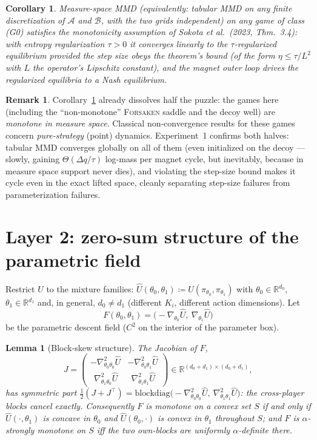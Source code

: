\documentclass[11pt]{article}
\newtheorem{lemma}{Lemma}
\newtheorem{corollary}{Corollary}
\theoremstyle{definition}
\newtheorem{remark}{Remark}
\newcommand{\R}{\mathbb{R}}
\newcommand{\cA}{\mathcal{A}}
\newcommand{\cB}{\mathcal{B}}
\begin{document}
\begin{corollary}\label{cor:measure-mmd}
Measure-space MMD (equivalently: tabular MMD on any finite discretization of
$\cA$ and $\cB$, with the two grids independent) on any game of class (G0)
satisfies the monotonicity assumption of Sokota et al.\ (2023, Thm.~3.4): with
entropy regularization $\tau > 0$ it converges linearly to the
$\tau$-regularized equilibrium provided the step size obeys the theorem's bound
(of the form $\eta \le \tau / L^2$ with $L$ the operator's Lipschitz constant),
and the magnet outer loop drives the regularized equilibria to a Nash
equilibrium.
\end{corollary}

\begin{remark}
Corollary~\ref{cor:measure-mmd} already dissolves half the puzzle: the games
here (including the ``non-monotone'' \textsc{Forsaken} saddle and the decoy
well) are \emph{monotone in measure space}. Classical non-convergence results
for these games concern \emph{pure-strategy} (point) dynamics. Experiment~1
confirms both halves: tabular MMD converges globally on all of them (even
initialized on the decoy --- slowly, gaining $\Theta(\Delta q / \tau)$ log-mass
per magnet cycle, but inevitably, because in measure space support never
dies), and violating the step-size bound makes it cycle even in the exact
lifted space, cleanly separating step-size failures from parameterization
failures.
\end{remark}

\section{Layer 2: zero-sum structure of the parametric field}

Restrict $U$ to the mixture families:
$\widehat{U}(\theta_0, \theta_1) \coloneqq U(\pi_{\theta_0}, \pi_{\theta_1})$
with $\theta_0 \in \R^{d_0}$, $\theta_1 \in \R^{d_1}$ and, in general,
$d_0 \ne d_1$ (different $K_i$, different action dimensions). Let
\[
  F(\theta_0,\theta_1) =
  \big({-}\nabla_{\theta_0}\widehat U,\ \nabla_{\theta_1}\widehat U\big)
\]
be the parametric descent field ($C^2$ on the interior of the parameter box).

\begin{lemma}[Block-skew structure]\label{lem:skewblock}
The Jacobian of $F$,
\[
  J = \begin{pmatrix}
    -\nabla^2_{\theta_0\theta_0} \widehat U & -\nabla^2_{\theta_0\theta_1} \widehat U\\[2pt]
    \ \ \nabla^2_{\theta_1\theta_0} \widehat U & \ \ \nabla^2_{\theta_1\theta_1} \widehat U
  \end{pmatrix}
  \in \R^{(d_0 + d_1) \times (d_0 + d_1)},
\]
has symmetric part
$\tfrac12 (J + J^\top) = \mathrm{blockdiag}\!\big({-}\nabla^2_{\theta_0\theta_0}
\widehat U,\ \nabla^2_{\theta_1\theta_1} \widehat U\big)$: the cross-player
blocks cancel exactly. Consequently $F$ is monotone on a convex set $S$ if and
only if $\widehat U(\cdot, \theta_1)$ is concave in $\theta_0$ and $\widehat
U(\theta_0, \cdot)$ is convex in $\theta_1$ throughout $S$; and $F$ is
$\alpha$-strongly monotone on $S$ iff the two own-blocks are uniformly
$\alpha$-definite there.
\end{lemma}
\end{document}
